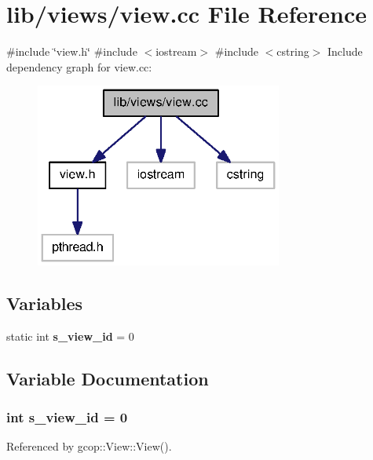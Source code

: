 \section{lib/views/view.cc \-File \-Reference}
\label{view_8cc}
{\ttfamily \#include \char`\"{}view.\-h\char`\"{}}\*
{\ttfamily \#include $<$iostream$>$}\*
{\ttfamily \#include $<$cstring$>$}\*
\-Include dependency graph for view.\-cc\-:
\nopagebreak
\begin{figure}[H]
\begin{center}
\leavevmode
\includegraphics[width=230pt]{view_8cc__incl}
\end{center}
\end{figure}
\subsection*{\-Variables}
\begin{DoxyCompactItemize}
\item 
static int {\bf s\-\_\-view\-\_\-id} = 0
\end{DoxyCompactItemize}


\subsection{\-Variable \-Documentation}
\subsubsection[{s\-\_\-view\-\_\-id}]{\setlength{\rightskip}{0pt plus 5cm}int {\bf s\-\_\-view\-\_\-id} = 0\hspace{0.3cm}{\ttfamily  [static]}}\label{view_8cc_adac42b0fabfda1a93611330ad368fff0}


\-Referenced by gcop\-::\-View\-::\-View().


